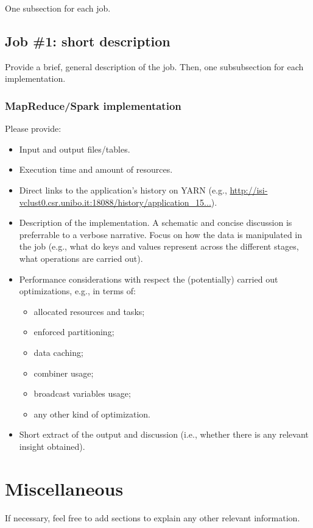 \documentclass[10pt]{article}
\begin{document}
One subsection for each job.

\subsection{Job \#1: short description}

Provide a brief, general description of the job. Then, one subsubsection for each implementation.

\subsubsection{MapReduce/Spark implementation}

Please provide:
\begin{itemize}
\item Input and output files/tables.
\item Execution time and amount of resources.
\item Direct links to the application's history on YARN (e.g., \url{http://isi-vclust0.csr.unibo.it:18088/history/application_15...}).
\item Description of the implementation. A schematic and concise discussion is preferrable to a verbose narrative. Focus on how the data is manipulated in the job (e.g., what do keys and values represent across the different stages, what operations are carried out). 
\item Performance considerations with respect the (potentially) carried out optimizations, e.g., in terms of:
\begin{itemize}
\item allocated resources and tasks;
\item enforced partitioning;
\item data caching;
\item combiner usage;
\item broadcast variables usage;
\item any other kind of optimization.
\end{itemize}
\item Short extract of the output and discussion (i.e., whether there is any relevant insight obtained).
\end{itemize}

\section{Miscellaneous}

If necessary, feel free to add sections to explain any other relevant information.
\end{document}
